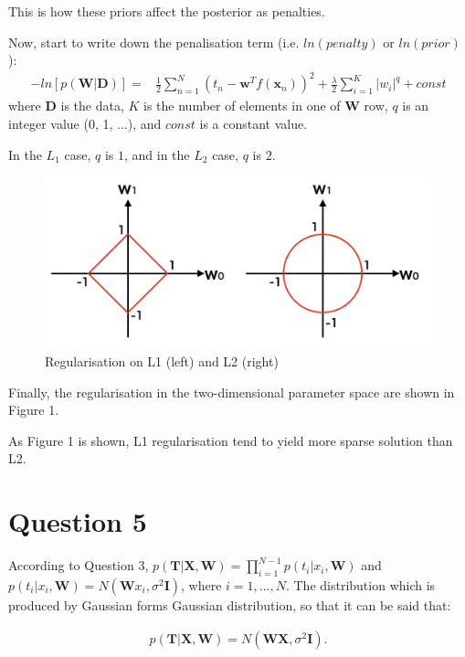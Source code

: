 \documentclass[12pt,letterpaper]{article}
\begin{document}
This is how these priors affect the posterior as penalties.

Now, start to write down the penalisation term
(i.e. $ln(penalty)$ or $ln(prior)$):
\begin{equation}
\begin{split}
-ln[p(\textbf{W} | \textbf{D})] = &
\frac{1}{2} \sum_{n=1}^{N} (t_n - \textbf{w}^Tf(\textbf{x}_n))^2
+ \frac{\lambda}{2}  \sum_{i=1}^{K} |w_i|^q + const
\end{split}
\end{equation}
where $\textbf{D}$ is the data,
$K$ is the number of elements in one of \textbf{W} row,
$q$ is an integer  value (0, 1, ...), 
and $const$ is a constant value.

In the $L_1$ case, $q$ is $1$,
and in the $L_2$ case, $q$ is $2$.


\begin{figure}[htb]
\centering
\includegraphics[scale =0.5]{L1and2.png} 
\caption{Regularisation on L1 (left) and L2 (right)}
\end{figure}

Finally, the regularisation in the two-dimensional parameter space are shown in Figure 1.

As Figure 1 is shown,
L1 regularisation tend to yield more sparse solution than L2.



\section*{Question 5}
According to Question 3,
$p(\textbf{T} | \textbf{X}, \textbf{W}) = \prod_{i=1}^{N - 1} p(t_i | x_i, \textbf{W})$
and $p(t_i | x_i, \textbf{W}) = N(\textbf{W}x_i, \sigma^2 \textbf{I})$,
where $i = {1, ..., N}$.
The distribution which is produced by Gaussian forms Gaussian distribution, so that it can be said that:

\begin{equation}
\begin{split}
p(\textbf{T}|\textbf{X}, \textbf{W}) = N(\textbf{W}\textbf{X}, \sigma^2 \textbf{I}).
\end{split}
\end{equation}
\end{document}
